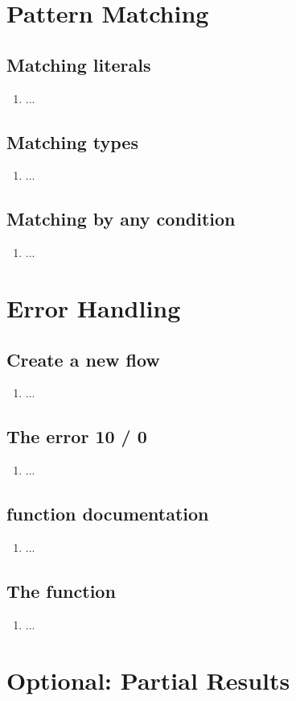 \section{Pattern Matching}

\subsection{Matching literals}
\begin{enumerate}
\item ...
\end{enumerate}

\subsection{Matching types}
\begin{enumerate}[resume*]
\item ...
\end{enumerate}

\subsection{Matching by any condition}
\begin{enumerate}[resume*]
\item ...
\end{enumerate}


\section{Error Handling}

\subsection{Create a new flow}
\begin{enumerate}
\item ...
\end{enumerate}

\subsection{The error 10 / 0}
\begin{enumerate}[resume*]
\item ...
\end{enumerate}

\subsection{ function documentation}
\begin{enumerate}[resume*]
\item ...
\end{enumerate}

\subsection{The  function}
\begin{enumerate}[resume*]
\item ...
\end{enumerate}


\section{Optional: Partial Results}
